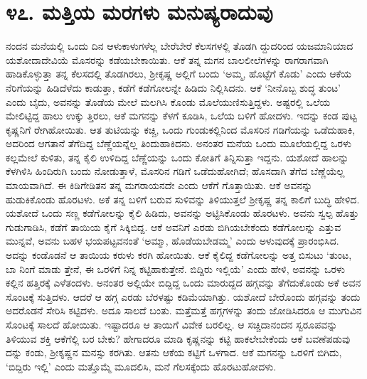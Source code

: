 
\chapter{೪೭. ಮತ್ತಿಯ ಮರಗಳು ಮನುಷ್ಯರಾದುವು}

ನಂದನ ಮನೆಯಲ್ಲಿ ಒಂದು ದಿನ ಆಳುಕಾಳುಗಳೆಲ್ಲ ಬೇರೆಬೇರೆ ಕೆಲಸಗಳಲ್ಲಿ ತೊಡಗಿ ದ್ದುದರಿಂದ ಯಜಮಾನಿಯಾದ ಯಶೋದಾದೇವಿಯೆ ಮೊಸರನ್ನು ಕಡೆಯಬೇಕಾಯಿತು. ಆಕೆ ತನ್ನ ಮಗನ ಬಾಲಲೀಲೆಗಳನ್ನು ರಾಗರಾಗವಾಗಿ ಹಾಡಿಕೊಳ್ಳುತ್ತಾ ತನ್ನ ಕೆಲಸದಲ್ಲಿ ತೊಡಗಿರಲು, ಶ್ರೀಕೃಷ್ಣ ಅಲ್ಲಿಗೆ ಬಂದು ‘ಅಮ್ಮ, ಹೊಟ್ಟೆಗೆ ಕೊಡು’ ಎಂದು ಆಕೆಯ ನೆರಿಗೆಯನ್ನು ಹಿಡಿದೆಳೆದು ಕಾಡುತ್ತಾ, ಕಡೆಗೆ ಕಡೆಗೋಲನ್ನೇ ಹಿಡಿದು ನಿಲ್ಲಿಸಿದನು. ಆಕೆ ‘ನೀನೊಬ್ಬ ಶುದ್ಧ ತುಂಟ’ ಎಂದು ಬೈದು, ಅವನನ್ನು ತೊಡೆಯ ಮೇಲೆ ಮಲಗಿಸಿ ಕೊಂಡು ಮೊಲೆಯುಣಿಸುತ್ತಿದ್ದಳು. ಅಷ್ಟರಲ್ಲಿ ಒಲೆಯ ಮೇಲಿಟ್ಟಿದ್ದ ಹಾಲು ಉಕ್ಕು ತ್ತಿರಲು, ಆಕೆ ಮಗನನ್ನು ಕೆಳಗೆ ಕೂಡಿಸಿ, ಒಲೆಯ ಬಳಿಗೆ ಹೋದಳು. ಇದನ್ನು ಕಂಡ ಪುಟ್ಟ ಕೃಷ್ಣನಿಗೆ ರೇಗಿಹೋಯಿತು. ಆತ ತುಟಿಯನ್ನು ಕಚ್ಚಿ, ಒಂದು ಗುಂಡುಕಲ್ಲಿನಿಂದ ಮೊಸರಿನ ಗಡಿಗೆಯನ್ನು ಒಡೆದುಹಾಕಿ, ಅದರಿಂದ ಆಗತಾನೆ ತೆಗೆದಿದ್ದ ಬೆಣ್ಣೆಯನ್ನೆಲ್ಲ ತಿಂದುಹಾಕಿದನು. ಅನಂತರ ಮನೆಯ ಒಂದು ಮೂಲೆಯಲ್ಲಿದ್ದ ಒರಳು ಕಲ್ಲಮೇಲೆ ಕುಳಿತು, ತನ್ನ ಕೈಲಿ ಉಳಿದಿದ್ದ ಬೆಣ್ಣೆಯನ್ನು ಒಂದು ಕೋತಿಗೆ ತಿನ್ನಿಸುತ್ತಾ ಇದ್ದನು. ಯಶೋದೆ ಹಾಲನ್ನು ಕೆಳಗಿಳಿಸಿ ಹಿಂದಿರುಗಿ ಬಂದು ನೋಡುತ್ತಾಳೆ, ಮೊಸರಿನ ಗಡಿಗೆ ಒಡೆದುಹೋಗಿದೆ; ಹೊಸದಾಗಿ ತೆಗೆದ ಬೆಣ್ಣೆಯೆಲ್ಲ ಮಾಯವಾಗಿದೆ. ಈ ಕಿಡಿಗೇಡಿತನ ತನ್ನ ಮಗರಾಯನದೇ ಎಂದು ಆಕೆಗೆ ಗೊತ್ತಾಯಿತು. ಆಕೆ ಅವನನ್ನು ಹುಡುಕಿಕೊಂಡು ಹೊರಟಳು. ಅಕೆ ತನ್ನ ಬಳಿಗೆ ಬರುವ ಸುಳಿವನ್ನು ತಿಳಿಯುತ್ತಲೆ ಶ್ರೀಕೃಷ್ಣ ತನ್ನ ಕಾಲಿಗೆ ಬುದ್ಧಿ ಹೇಳಿದ. ಯಶೋದೆ ಒಂದು ಸಣ್ಣ ಕಡೆಗೋಲನ್ನು ಕೈಲಿ ಹಿಡಿದು, ಅವನನ್ನು ಅಟ್ಟಿಸಿಕೊಂಡು ಹೊರಟಳು. ಅವನು ಸ್ವಲ್ಪ ಹೊತ್ತು ಗುಡುಗಾಡಿಸಿ, ಕಡೆಗೆ ತಾಯಿಯ ಕೈಗೆ ಸಿಕ್ಕಿಬಿದ್ದ. ಆಕೆ ಅವನಿಗೆ ಎರಡು ಬಿಗಿಯಬೇಕೆಂದು ಕಡೆಗೋಲನ್ನು ಎತ್ತುವ ಮುನ್ನವೆ, ಅವನು ಬಹಳ ಭಯಪಟ್ಟವನಂತೆ ‘ಅಮ್ಮಾ, ಹೊಡೆಯಬೇಡಮ್ಮ’ ಎಂದು ಅಳುವುದಕ್ಕೆ ಪ್ರಾರಂಭಿಸಿದ. ಅದನ್ನು ಕಂಡೊಡನೆ ಆ ತಾಯಿಯ ಕರುಳು ಕರಗಿ ಹೋಯಿತು. ಆಕೆ ಕೈಲಿದ್ದ ಕಡೆಗೋಲನ್ನು ಅತ್ತ ಬಿಸುಟು ‘ತುಂಟ, ಬಾ ನಿಂಗೆ ಮಾಡು ತ್ತೇನೆ, ಈ ಒರಳಿಗೆ ನಿನ್ನ ಕಟ್ಟಿಹಾಕುತ್ತೇನೆ. ಬಿದ್ದಿರು ಇಲ್ಲಿಯೆ’ ಎಂದು ಹೇಳಿ, ಅವನನ್ನು ಒರಳು ಕಲ್ಲಿನ ಹತ್ತಿರಕ್ಕೆ ಎಳೆತಂದಳು. ಅನಂತರ ಅಲ್ಲಿಯೇ ಬಿದ್ದಿದ್ದ ಒಂದು ಮಾರುದ್ದದ ಹಗ್ಗವನ್ನು ತೆಗೆದುಕೊಂಡು ಅಕೆ ಅವನ ಸೊಂಟಕ್ಕೆ ಸುತ್ತಿದಳು. ಆದರೆ ಆ ಹಗ್ಗ ಎರಡು ಬೆರಳಷ್ಟು ಕಡಿಮೆಯಾಗಿತ್ತು. ಯಶೋದೆ ಬೇರೊಂದು ಹಗ್ಗವನ್ನು ತಂದು ಅದರೊಡನೆ ಸೇರಿಸಿ ಕಟ್ಟಿದಳು. ಅದೂ ಸಾಲದೆ ಬಂತು. ಮತ್ತೆಮತ್ತೆ ಹಗ್ಗಗಳನ್ನು ತಂದು ಜೋಡಿಸಿದರೂ ಆ ಮುಗುವಿನ ಸೊಂಟಕ್ಕೆ ಸಾಲದೆ ಹೋಯಿತು. ಇಷ್ಟಾದರೂ ಆ ತಾಯಿಗೆ ವಿವೇಕ ಬರಲಿಲ್ಲ. ಆ ಸಚ್ಚಿದಾನಂದನ ಸ್ವರೂಪವನ್ನು ತಿಳಿಯುವ ಶಕ್ತಿ ಆಕೆಗೆಲ್ಲಿ ಬರ ಬೇಕು? ಹೇಗಾದರೂ ಮಾಡಿ ಕೃಷ್ಣನನ್ನು ಕಟ್ಟಿ ಹಾಕಲೇಬೇಕೆಂದು ಆಕೆ ಬವಣೆಪಡುವು ದನ್ನು ಕಂಡು, ಶ್ರೀಕೃಷ್ಣನ ಮನಸ್ಸು ಕರಗಿತು. ಆತನು ಆಕೆಯ ಕಟ್ಟಿಗೆ ಒಳಗಾದ. ಆಕೆ ಮಗನನ್ನು ಒರಳಿಗೆ ಬಿಗಿದು, ‘ಬಿದ್ದಿರು ಇಲ್ಲಿ’ ಎಂದು ಮತ್ತೊಮ್ಮೆ ಮೂದಲಿಸಿ, ಮನೆ ಗೆಲಸಕ್ಕೆಂದು ಹೊರಟುಹೋದಳು.

